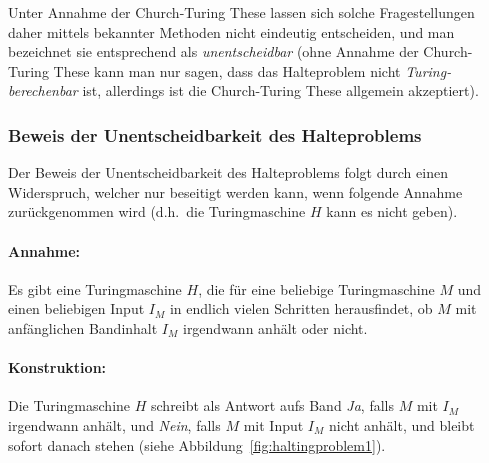 Unter Annahme der Church-Turing These lassen sich solche Fragestellungen daher mittels bekannter Methoden nicht eindeutig entscheiden, und man bezeichnet sie entsprechend als \emph{unentscheidbar} (ohne Annahme der Church-Turing These kann man nur sagen, dass das Halteproblem nicht \emph{Turing-berechenbar} ist, allerdings ist die Church-Turing These allgemein akzeptiert).

\subsubsection{Beweis der Unentscheidbarkeit des Halteproblems}
\label{sec:proof_haltingproblem}
%
Der Beweis der Unentscheidbarkeit des Halteproblems folgt durch einen Widerspruch, welcher nur beseitigt werden kann, wenn folgende Annahme zurückgenommen wird (d.h.\ die Turingmaschine $H$ kann es nicht geben).

\paragraph{Annahme:}
Es gibt eine Turingmaschine $H$, die für eine beliebige Turingmaschine $M$ und einen beliebigen Input $I_M$ in endlich vielen Schritten herausfindet, ob $M$ mit anfänglichen Bandinhalt $I_M$ irgendwann anhält oder nicht.

\paragraph{Konstruktion:}
Die Turingmaschine $H$ schreibt als Antwort aufs Band \emph{Ja}, falls $M$ mit $I_M$ irgendwann anhält, und \emph{Nein}, falls $M$ mit Input $I_M$ nicht anhält, und bleibt sofort danach stehen (siehe Abbildung~\ref{fig:haltingproblem1}).

